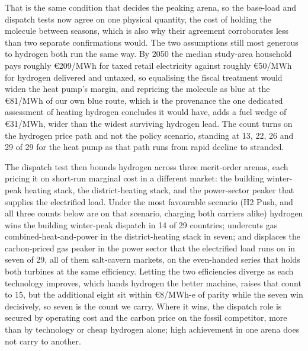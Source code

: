 That is the same condition that decides the peaking arena, so the base-load and dispatch
tests now agree on one physical quantity, the cost of holding the molecule between
seasons, which is also why their agreement corroborates less than two separate
confirmations would. The two assumptions still most generous to
hydrogen both run the same way. By 2050 the median study-area household pays roughly \euro{}209/MWh for
taxed retail electricity against roughly \euro{}50/MWh for hydrogen delivered and
untaxed, so equalising the fiscal treatment would widen the heat pump's margin, and
repricing the molecule as blue at the \euro{}81/MWh of our own blue route, which is the provenance the one dedicated assessment of heating hydrogen concludes it would have, adds a fuel wedge of \euro{}31/MWh, wider than the widest surviving hydrogen lead. The count turns on the hydrogen price
path and not the policy scenario, standing at 13, 22, 26 and 29 of 29 for the heat pump
as that path runs from rapid decline to stranded.

The dispatch test then bounds hydrogen across three merit-order arenas,
each pricing it on short-run marginal cost in a different market: the building
winter-peak heating stack, the district-heating stack, and the power-sector peaker
that supplies the electrified load. Under the most
favourable scenario (H2 Push, and all three counts below are on that scenario, charging
both carriers alike) hydrogen
wins the building winter-peak dispatch in 14 of 29 countries; undercuts gas
combined-heat-and-power in the district-heating stack in seven; and displaces the
carbon-priced gas peaker in the power sector that the electrified load runs on in seven
of 29, all of them salt-cavern markets, on the even-handed series that holds both
turbines at the same efficiency. Letting the two efficiencies diverge as each technology
improves, which hands hydrogen the better machine, raises that count to 15, but the
additional eight sit within \euro{}8/MWh-e of parity while the seven win decisively, so
seven is the count we carry. Where it wins, the dispatch role is secured by operating cost and
the carbon price on the fossil competitor, more than by technology or cheap hydrogen
alone; high achievement in one arena does not carry to another.


